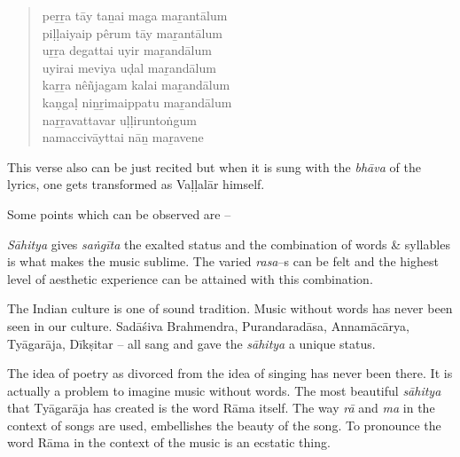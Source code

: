 \begin{verse}
\end{verse}

\begin{verse}
peṟṟa tāy taṉai maga maṟantālum\\ piḷḷaiyaip pêrum tāy maṟantālum\\ uṟṟa degattai uyir maṟandālum\\ uyirai meviya uḍal maṟandālum\\ kaṟṟa nêñjagam kalai maṟandālum\\ kaṇgaḷ niṉṟimaippatu maṟandālum\\ naṟṟavattavar uḷḷiruntoṅgum\\ namaccivāyttai nāṉ maṟavene
\end{verse}

This verse also can be just recited but when it is sung with the \textit{bhāva} of the lyrics, one gets transformed as Vaḷḷalār himself.

Some points which can be observed are –

\item \textit{Sāhitya} gives \textit{saṅgīta} the exalted status and the combination of words \& syllables is what makes the music sublime. The varied \textit{rasa}–s can be felt and the highest level of aesthetic experience can be attained with this combination.

 \item The Indian culture is one of sound tradition. Music without words has never been seen in our culture. Sadāśiva Brahmendra, Purandaradāsa, Annamācārya, Tyāgarāja, Dīkṣitar – all sang and gave the \textit{sāhitya} a unique status. 

 \item The idea of poetry as divorced from the idea of singing has never been there. It is actually a problem to imagine music without words. The most beautiful \textit{sāhitya} that Tyāgarāja has created is the word Rāma itself. The way \textit{rā} and \textit{ma} in the context of songs are used, embellishes the beauty of the song. To pronounce the word Rāma in the context of the music is an ecstatic thing.

